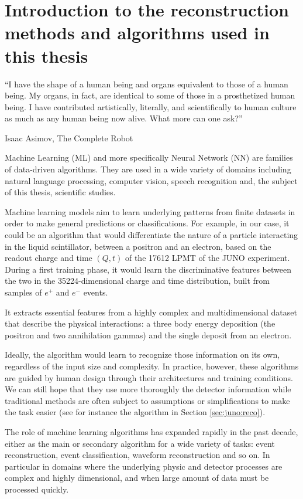 \documentclass[../main.tex]{subfiles}
\begin{document}
\chapter{Introduction to the reconstruction methods and algorithms used in this thesis}
\label{sec:ml}

\epigraph{``I have the shape of a human being and organs equivalent to those of a human being. My organs, in fact, are identical to some of those in a prosthetized human being. I have contributed artistically, literally, and scientifically to human culture as much as any human being now alive. What more can one ask?''}{Isaac Asimov, The Complete Robot}

\minitoc

Machine Learning (ML) and more specifically Neural Network (NN) are families of data-driven algorithms. They are used in a wide variety of domains including natural language processing, computer vision, speech recognition and, the subject of this thesis, scientific studies.

Machine learning models aim to learn underlying patterns from finite datasets in order to make general predictions or classifications.
For example, in our case, it could be an algorithm that would differentiate the nature of a particle interacting in the liquid scintillator, between a positron and an electron, based on the readout charge and time $(Q, t)$ of the 17612 LPMT of the JUNO experiment. During a first training phase, it would learn the discriminative features between the two in the 35224-dimensional charge and time distribution, built from samples of $e^+$ and $e^-$ events.

It extracts essential features from a highly complex and multidimensional dataset that describe the physical interactions: a three body energy deposition (the positron and two annihilation gammas) and the single deposit from an electron.

Ideally, the algorithm would learn to recognize those information on its own, regardless of the input size and complexity. In practice, however, these algorithms are guided by human design through their architectures and training conditions. We can still hope that they use more thoroughly the detector information while traditional methods are often subject to assumptions or simplifications to make the task easier (see for instance the algorithm in Section \ref{sec:juno:reco}).

The role of machine learning algorithms has expanded rapidly in the past decade, either as the main or secondary algorithm for a wide variety of tasks: event reconstruction, event classification, waveform reconstruction and so on. In particular in domains where the underlying physic and detector processes are complex and highly dimensional, and when large amount of data must be processed quickly.
\end{document}
